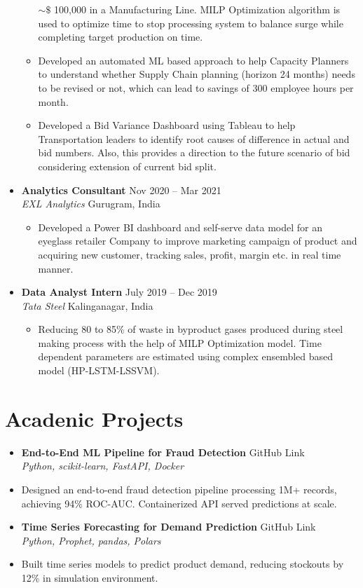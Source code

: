 \documentclass[a4paper,10pt]{article}
\newcommand{\resumeItem}[1]{\item\small{#1}}
\newcommand{\resumeSubheading}[4]{
  \vspace{1pt}\item
    \textbf{#1} \hfill {#2} \\
    \emph{#3} \hfill {#4} \\
}
\begin{document}
\begin{itemize}
\begin{itemize}
{            $\sim\$$ 100,000 in a Manufacturing Line. MILP Optimization algorithm is used to optimize time to stop processing
            system to balance surge while completing target production on time.
          }
          \resumeItem{
            Developed an automated ML based approach to help Capacity Planners to understand whether Supply Chain
            planning (horizon 24 months) needs to be revised or not, which can lead to savings of 300 employee hours per
            month.
          }
          \resumeItem{
            Developed a Bid Variance Dashboard using Tableau to help Transportation leaders to identify root causes of
            difference in actual and bid numbers. Also, this provides a direction to the future scenario of bid considering
            extension of current bid split.
          }
      \end{itemize}
    
    \resumeSubheading
      {Analytics Consultant}{Nov 2020 -- Mar 2021}
      {EXL Analytics}{Gurugram, India}
      \begin{itemize}
          \resumeItem{
            Developed a Power BI dashboard and self-serve data model for an eyeglass retailer Company to improve
            marketing campaign of product and acquiring new customer, tracking sales, profit, margin etc. in real time
            manner.
          }
      \end{itemize}

    \resumeSubheading
      {Data Analyst Intern}{July 2019 -- Dec 2019}
      {Tata Steel}{Kalinganagar, India}
      \begin{itemize}
          \resumeItem{
            Reducing 80 to 85\% of waste in byproduct gases produced during steel making process with the help of MILP
            Optimization model. Time dependent parameters are estimated using complex ensembled based model (HP-LSTM-LSSVM).
          }
      \end{itemize}
\end{itemize}

\section*{Acadenic Projects}
\begin{itemize}
    \resumeSubheading
      {End-to-End ML Pipeline for Fraud Detection}{GitHub Link}
      {Python, scikit-learn, FastAPI, Docker}{}
      \resumeItem{Designed an end-to-end fraud detection pipeline processing 1M+ records, achieving 94\% ROC-AUC. Containerized API served predictions at scale.}

    \resumeSubheading
      {Time Series Forecasting for Demand Prediction}{GitHub Link}
      {Python, Prophet, pandas, Polars}{}
      \resumeItem{Built time series models to predict product demand, reducing stockouts by 12\% in simulation environment.}
\end{itemize}
\end{document}
